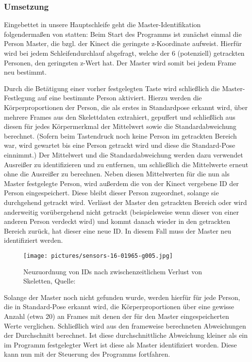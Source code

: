 \subsubsection{Umsetzung}
Eingebettet in unsere Hauptschleife geht die Master-Identifikation folgendermaßen von statten: Beim Start des Programms ist zunächst einmal die Person Master, die bzgl. der Kinect die geringste z-Koordinate aufweist. Hierfür wird bei jedem Schleifendurchlauf abgefragt, welche der 6 (potenziell) getrackten Personen, den geringsten z-Wert hat. Der Master wird somit bei jedem Frame neu bestimmt.
\par
 Durch die Betätigung einer vorher festgelegten Taste wird schließlich die Master-Festlegung auf eine bestimmte Person aktiviert. Hierzu werden die Körperproportionen der Person, die als erstes in Standardpose erkannt wird, über mehrere Frames aus den Skelettdaten extrahiert, gepuffert und schließlich aus diesen für jedes Körpermerkmal der Mittelwert sowie die Standardabweichung berechnet. (Sofern beim Tastendruck noch keine Person im getrackten Bereich war, wird gewartet bis eine Person getrackt wird und diese die Standard-Pose einnimmt.) Der Mittelwert und die Standardabweichung werden dazu verwendet Ausreißer zu identifizieren und zu entfernen, um schließlich die Mittelwerte erneut ohne die Ausreißer zu berechnen. Neben diesen Mittelwerten für die nun als Master festgelegte Person, wird außerdem die von der Kinect vergebene ID der Person eingespeichert. Diese bleibt dieser Person zugeordnet, solange sie durchgehend getrackt wird. Verlässt der Master den getrackten Bereich oder wird anderweitig vorübergehend nicht getrackt (beispielsweise wenn dieser von einer anderen Person verdeckt wird) und kommt danach wieder in den getrackten Bereich zurück, hat dieser eine neue ID. In diesem Fall muss der Master neu identifiziert werden. 
 
 \begin{figure}
\texttt{[image: pictures/sensors-16-01965-g005.jpg]}
\caption{Neuzuordnung von IDs nach zwischenzeitlichem \glqq Verlust\grqq{} von Skeletten, Quelle:\cite{bodyprop}}
\label{fig:fehlerk}
\end{figure}
 \par
 Solange der Master noch nicht gefunden wurde, werden hierfür für jede Person, die in Standard-Pose erkannt wird, die Körperproportionen über eine gewisse Anzahl (etwa 20) an Frames mit denen der für den Master eingespeicherten Werte verglichen. Schließlich wird aus den frameweise berechneten Abweichungen der Durchschnitt berechnet. Ist diese durchschnittliche Abweichung kleiner als ein im Programm festgelegter Wert ist diese als Master identifiziert worden. Diese kann nun mit der Steuerung des Programms fortfahren.
	
	